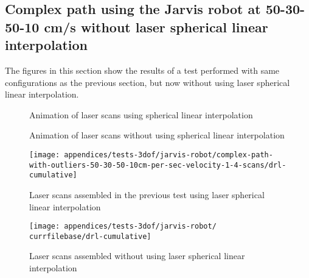 \subsection{Complex path using the Jarvis robot at 50-30-50-10 cm/s without laser spherical linear interpolation}\label{subsec:appendix-a_jarvis-robot-tests_complex-path-using-the-jarvis-robot-at-50-30-50-10-cm-s-without-laser-spherical-linear-interpolation}

The figures in this section show the results of a test performed with same configurations as the previous section, but now without using laser spherical linear interpolation.


\begin{figure}[H]
	\centering
	\caption{Animation of laser scans using spherical linear interpolation}
\end{figure}

\begin{figure}[H]
	\centering
	\caption{Animation of laser scans without using spherical linear interpolation}
\end{figure}


\begin{figure}[H]
	\centering
	\texttt{[image: appendices/tests-3dof/jarvis-robot/complex-path-with-outliers-50-30-50-10cm-per-sec-velocity-1-4-scans/drl-cumulative]}
	\caption{Laser scans assembled in the previous test using laser spherical linear interpolation}
	\label{fig:appendix-a_jarvis-robot-tests_complex-path-using-the-jarvis-robot-at-50-30-50-10-cm-s-without-laser-spherical-linear-interpolation_lasers-with-interpolation}
\end{figure}

\begin{figure}[H]
	\centering
	\texttt{[image: appendices/tests-3dof/jarvis-robot/\\currfilebase/drl-cumulative]}
	\caption{Laser scans assembled without using laser spherical linear interpolation}
	\label{fig:appendix-a_jarvis-robot-tests_complex-path-using-the-jarvis-robot-at-50-30-50-10-cm-s-without-laser-spherical-linear-interpolation_lasers-without-interpolation}
\end{figure}



